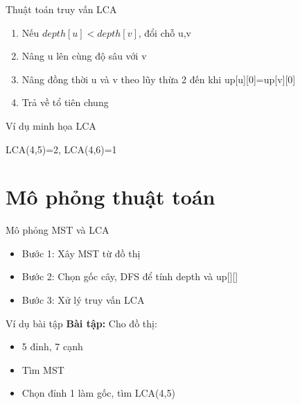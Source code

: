 \documentclass[aspectratio=169]{beamer}
\begin{document}
\begin{frame}{Thuật toán truy vấn LCA}
\begin{enumerate}
    \item Nếu $depth[u]<depth[v]$, đổi chỗ u,v
    \item Nâng u lên cùng độ sâu với v
    \item Nâng đồng thời u và v theo lũy thừa 2 đến khi up[u][0]=up[v][0]
    \item Trả về tổ tiên chung
\end{enumerate}
\end{frame}

\begin{frame}{Ví dụ minh họa LCA}
\begin{center}

LCA(4,5)=2, LCA(4,6)=1
\end{center}
\end{frame}

\section{Mô phỏng thuật toán}
\begin{frame}{Mô phỏng MST và LCA}
\begin{itemize}
    \item Bước 1: Xây MST từ đồ thị
    \item Bước 2: Chọn gốc cây, DFS để tính depth và up[][]
    \item Bước 3: Xử lý truy vấn LCA
\end{itemize}
\end{frame}

\begin{frame}{Ví dụ bài tập}
\textbf{Bài tập:} Cho đồ thị: 
\begin{itemize}
    \item 5 đỉnh, 7 cạnh
    \item Tìm MST
    \item Chọn đỉnh 1 làm gốc, tìm LCA(4,5)
\end{itemize}
\end{frame}
\end{document}
